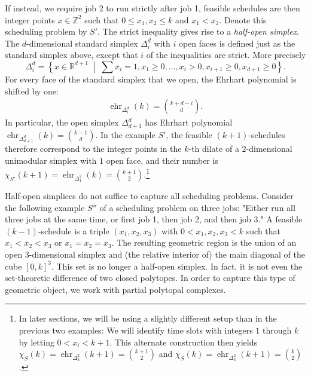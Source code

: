 \documentclass[12pt,reqno]{amsart}
\numberwithin{definition}{section}
\theoremstyle{definition}
\newcommand{\RR}{\mathbb{R}}
\newcommand{\ZZ}{\mathbb{Z}}
\newcommand{\ehr}{\operatorname{ehr}}
\newcommand{\mset}[2]{ \left\{ #1 \; \middle| \; #2 \right\}}
\begin{document}
If instead, we require job 2 to run strictly after job 1, feasible schedules are then integer points $x\in\ZZ^2$ such that $0\leq x_1,x_2 \leq k$ and $x_1 < x_2$. Denote this scheduling problem by $S'$. The strict inequality gives rise to a \emph{half-open simplex}. The $d$-dimensional standard simplex $\Delta^d_i$ with $i$ open faces is defined just as the standard simplex above, except that $i$ of the inequalities are strict. More precisely
\[
    \Delta^d_i = \mset{x\in\RR^{d+1}}{\sum x_i =1, x_1 \geq 0, \ldots, x_i > 0, x_{i+1} \geq 0, x_{d+1} \geq 0}.
\]
For every face of the standard simplex that we open, the Ehrhart polynomial is shifted by one:
\begin{eqnarray}
  \ehr_{\Delta^d_i}(k) = \binom{k+d-i}{d}.
  \label{eqn:half-open-simplex}
\end{eqnarray}
In particular, the open simplex $\Delta^d_{d+1}$ has Ehrhart polynomial $\ehr_{\Delta^d_{d+1}}(k) = \binom{k-1}{d}$. In the example $S'$, the feasible $(k+1)$-schedules therefore correspond to the integer points in the $k$-th dilate of a $2$-dimensional unimodular simplex with $1$ open face, and their number is $\chi_{S'}(k+1)=\ehr_{\Delta^2_1}(k) = \binom{k+1}{2}$.\footnote{In later sections, we will be using a slightly different setup than in the previous two examples: We will identify time slots with integers $1$ through $k$ by letting $0<x_i<k+1$. This alternate construction then yields $\chi_S(k)=\ehr_{\Delta^2_2}(k+1)=\binom{k+1}{2}$ and $\chi_S(k)=\ehr_{\Delta^2_3}(k+1)=\binom{k}{2}$.}

Half-open simplices do not suffice to capture all scheduling problems. Consider the following example $S''$ of a scheduling problem on three jobs: "Either run all three jobs at the same time, or first job 1, then job 2, and then job 3." A feasible $(k-1)$-schedule is a triple $(x_1,x_2,x_3)$ with $0< x_1,x_2,x_3 < k$ such that $x_1<x_2<x_3$ or $x_1=x_2=x_3$. The resulting geometric region is the union of an open 3-dimensional simplex and (the relative interior of) the main diagonal of the cube $[0,k]^3$. This set is no longer a half-open simplex. In fact, it is not even the set-theoretic difference of two closed polytopes. In order to capture this type of geometric object, we work with partial polytopal complexes.

%
\end{document}

